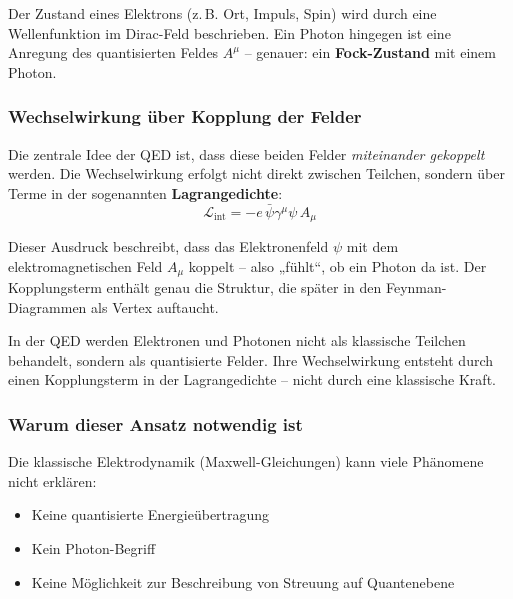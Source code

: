 Der Zustand eines Elektrons (z.\,B. Ort, Impuls, Spin) wird durch eine Wellenfunktion im Dirac-Feld beschrieben. Ein Photon hingegen ist eine Anregung des quantisierten Feldes $A^\mu$ – genauer: ein \textbf{Fock-Zustand} mit einem Photon.

\subsubsection*{Wechselwirkung über Kopplung der Felder}
Die zentrale Idee der QED ist, dass diese beiden Felder \emph{miteinander gekoppelt} werden. Die Wechselwirkung erfolgt nicht direkt zwischen Teilchen, sondern über Terme in der sogenannten \textbf{Lagrangedichte}:
\[
\mathcal{L}_{\text{int}} = -e \, \bar{\psi} \gamma^\mu \psi \, A_\mu
\]

Dieser Ausdruck beschreibt, dass das Elektronenfeld $\psi$ mit dem elektromagnetischen Feld $A_\mu$ koppelt – also „fühlt“, ob ein Photon da ist. Der Kopplungsterm enthält genau die Struktur, die später in den Feynman-Diagrammen als Vertex auftaucht.

\vspace{0.5em}
\begin{tcolorbox}[physikbox, title=Feldtheorie statt Teilchenmechanik]
	\label{box:Feldtheorie statt Teilchenmechanik}
	In der QED werden Elektronen und Photonen nicht als klassische Teilchen behandelt, sondern als quantisierte Felder. Ihre Wechselwirkung entsteht durch einen Kopplungsterm in der Lagrangedichte – nicht durch eine klassische Kraft.
\end{tcolorbox}

\subsubsection*{Warum dieser Ansatz notwendig ist}
Die klassische Elektrodynamik (Maxwell-Gleichungen) kann viele Phänomene nicht erklären:
\begin{itemize}
	\item Keine quantisierte Energieübertragung
	\item Kein Photon-Begriff
	\item Keine Möglichkeit zur Beschreibung von Streuung auf Quantenebene
\end{itemize}

